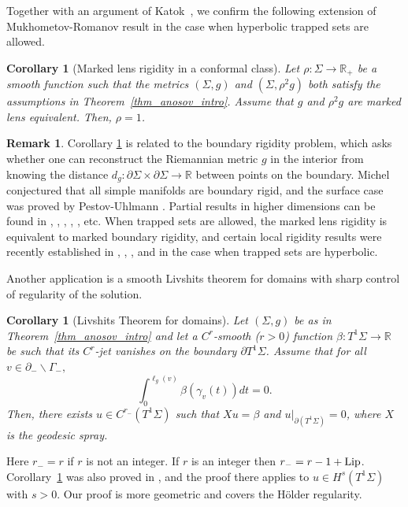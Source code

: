\documentclass[JEP,XML,SOM,Unicode,NoFloatCountersInSection]{cedram}
\newcommand{\elg}{\ell_g}
\newtheorem{corintro}[thmintro]{Corollary}
\theoremstyle{definition}
\newtheorem*{remark*}{Remark}
\newcommand{\field}[1]{\mathbb{#1}}
\newcommand{\R}{\field{R}}
\renewcommand{\>}{{\rangle}}
\newcommand{\<}{{\langle}}
\begin{document}
Together with an argument of Katok~\cite{K88}, we confirm the following extension of Mukhometov-Romanov result \cite{MR78} in the case when hyperbolic trapped sets are allowed.
\begin{corintro}[Marked lens rigidity in a conformal class]
\label{cor_conf_class}
Let $\rho\colon \Sigma\to\R_+$ be a smooth function such that the metrics $(\Sigma, g)$ and $(\Sigma, \rho^2 g)$ both satisfy the assumptions in Theorem~\ref{thm_anosov_intro}. Assume that $g$ and $\rho^2 g$ are marked lens equivalent. Then, $\rho=1$.
\end{corintro}

\begin{remark*}
Corollary \ref{cor_conf_class} is related to the boundary rigidity problem, which asks whether one can reconstruct the Riemannian metric $g$ in the interior from knowing the distance $d_g: \partial \Sigma\times \partial \Sigma\to\mathbb{R}$ between points on the boundary. Michel \cite{M81} conjectured that all simple manifolds are boundary rigid, and the surface case was proved by Pestov-Uhlmann \cite{PU05}. Partial results in higher dimensions can be found in \cite{SU09}, \cite{V09}, \cite{BI10}, \cite{BI13}, \cite{SUV17}, etc. When trapped sets are allowed, the marked lens rigidity is equivalent to marked boundary rigidity, and certain local rigidity results were recently established in \cite{G17}, \cite{GM18}, \cite{L19}, and \cite{L20} in the case when trapped sets are hyperbolic.
\end{remark*}

Another application is a smooth Livshits theorem for domains with sharp control of regularity of the solution.

\begin{corintro}[Livshits Theorem for domains]
\label{thm_Livshits}
Let $(\Sigma, g)$ be as in Theorem~\ref{thm_anosov_intro} and let a $C^r$-smooth ($r>0$) function $\beta\colon T^1\Sigma\to\R$ be such that its $C^r$-jet vanishes on the boundary $\partial T^1\Sigma$. Assume that for all $v\in\partial_-\backslash \Gamma_-,$
\[
\int_{0}^{\elg(v)}\beta(\gamma_v(t))dt=0.
\]
Then, there exists $u\in C^{r_-}(T^1\Sigma)$ such that $Xu=\beta$ and $u|_{\partial(T^1\Sigma)}=0$, where $X$ is the geodesic spray.
\end{corintro}

Here $r_-=r$ if $r$ is not an integer. If $r$ is an integer then $r_-=r-1+\textup{Lip}$. Corollary~\ref{thm_Livshits} was also proved in \cite[Prop.\,5.5]{G17}, and the proof there applies to $u\in H^s(T^1\Sigma)$ with $s>0$. Our proof is more geometric and covers the Hölder regularity.
\end{document}
